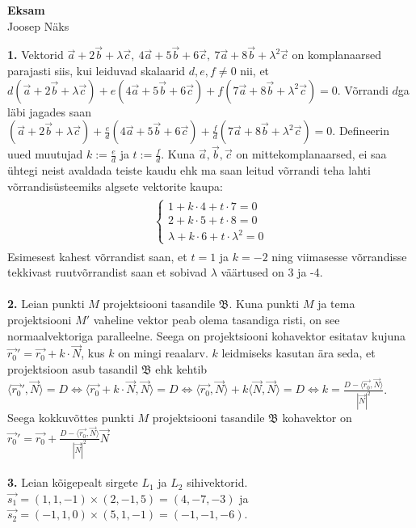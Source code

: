 \documentclass{article}
\begin{document}
\begin{center}
\Large\textbf{Eksam}\\
\small{Joosep Näks}
\end{center}
\textbf{1. } Vektorid $\vec{a}+2\vec b+\lambda\vec c,\ 4\vec{a}+5\vec b+6\vec c,\ 7\vec a+8\vec b+\lambda^2\vec{c}$ on komplanaarsed parajasti siis, kui leiduvad skalaarid $d,e,f\neq0$ nii, et $d(\vec{a}+2\vec b+\lambda\vec c)+e(4\vec{a}+5\vec b+6\vec c)+f(7\vec a+8\vec b+\lambda^2\vec{c})=0$. Võrrandi $d$ga läbi jagades saan $(\vec{a}+2\vec b+\lambda\vec c)+\frac e d(4\vec{a}+5\vec b+6\vec c)+\frac f d(7\vec a+8\vec b+\lambda^2\vec{c})=0$. Defineerin uued muutujad $k:=\frac e d$ ja $t:=\frac f d$. Kuna $\vec a, \vec b,\vec c$ on mittekomplanaarsed, ei saa ühtegi neist avaldada teiste kaudu ehk ma saan leitud võrrandi teha lahti võrrandisüsteemiks algsete vektorite kaupa:
\begin{gather*}
\begin{aligned}
\left\{\begin{aligned}
1+k\cdot4+t\cdot7=0\\
2+k\cdot5+t\cdot8=0\\
\lambda+k\cdot6+t\cdot\lambda^2=0
\end{aligned}\right.
\end{aligned}
\end{gather*}
Esimesest kahest võrrandist saan, et $t=1$ ja $k=-2$ ning viimasesse võrrandisse tekkivast ruutvõrrandist saan et sobivad $\lambda$ väärtused on 3 ja -4.\\\\
\textbf{2. }Leian punkti $M$ projektsiooni tasandile $\mathfrak{B}$. Kuna punkti $M$ ja tema projektsiooni $M'$ vaheline vektor peab olema tasandiga risti, on see normaalvektoriga paralleelne. Seega on projektsiooni kohavektor esitatav kujuna $\vec{r_0}'=\vec{r_0}+k\cdot \vec{N}$, kus $k$ on mingi reaalarv. $k$ leidmiseks kasutan ära seda, et projektsioon asub tasandil $\mathfrak{B}$ ehk kehtib $\langle\vec{r_0}',\vec{N}\rangle=D \Leftrightarrow \langle\vec{r_0}+k\cdot\vec{N},\vec{N}\rangle=D \Leftrightarrow \langle\vec{r_0},\vec{N}\rangle+k\langle\vec{N},\vec{N}\rangle=D \Leftrightarrow k=\frac{D-\langle\vec{r_0},\vec{N}\rangle}{|\vec{N}|^2}$.\\
Seega kokkuvõttes punkti $M$ projektsiooni tasandile $\mathfrak{B}$ kohavektor on\\ $\vec{r_0}'=\vec{r_0}+\frac{D-\langle\vec{r_0},\vec{N}\rangle}{|\vec{N}|^2}\vec{N}$\\\\
\textbf{3.} Leian kõigepealt sirgete $L_1$ ja $L_2$ sihivektorid. $\vec{s_1}=(1,1,-1)\times(2,-1,5)=(4,-7,-3)$ ja $\vec{s_2}=(-1,1,0)\times(5,1,-1)=(-1,-1,-6)$.\\
\end{document}
